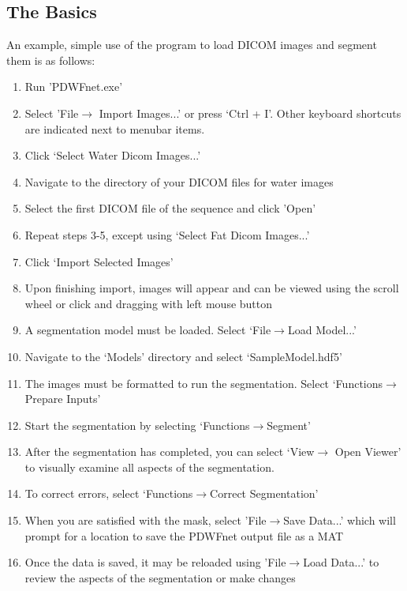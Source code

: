 \documentclass[twoside,a4paper]{refart}
\begin{document}
\subsection{The Basics}

An example, simple use of the program to load DICOM images and segment them is as follows:

\begin{enumerate}
	\item Run 'PDWFnet.exe'
	\item Select 'File$\rightarrow$ Import Images...' or press `Ctrl + I'. Other keyboard shortcuts are indicated next to menubar items.
	\item Click `Select Water Dicom Images...'
	\item Navigate to the directory of your DICOM files for water images
	\item Select the first DICOM file of the sequence and click 'Open'
	\item Repeat steps 3-5, except using `Select Fat Dicom Images...'
	\item Click `Import Selected Images'
	\item Upon finishing import, images will appear and can be viewed using the scroll wheel or click and dragging with left mouse button
	\item A segmentation model must be loaded. Select `File$\rightarrow$Load Model...'
	\item Navigate to the `Models' directory and select `SampleModel.hdf5'
	\item The images must be formatted to run the segmentation. Select `Functions$\rightarrow$Prepare Inputs'
	\item Start the segmentation by selecting `Functions$\rightarrow$Segment'
	\item After the segmentation has completed, you can select `View$\rightarrow$ Open Viewer' to visually examine all aspects of the segmentation.
	\item To correct errors, select `Functions$\rightarrow$Correct Segmentation'
	\item When you are satisfied with the mask, select 'File$\rightarrow$Save Data...' which will prompt for a location to save the PDWFnet output file as a MAT
	\item Once the data is saved, it may be reloaded using 'File$\rightarrow$Load Data...' to review the aspects of the segmentation or make changes

\end{enumerate}
\end{document}
